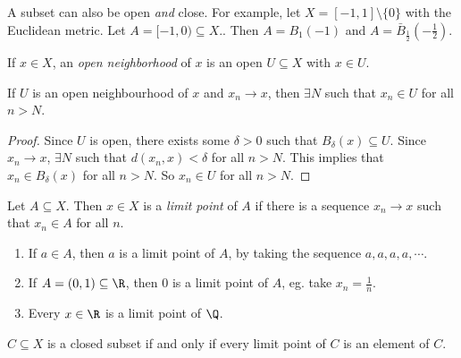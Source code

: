 \documentclass[a4paper]{article}
\begin{document}
A subset can also be open \emph{and} close. For example, let $X = [-1, 1]\setminus \{0\}$ with the Euclidean metric. Let $A = [-1, 0)\subseteq X$.. Then $A = B_1(-1)$ and $A = \bar B_{\frac{1}{2}}(-\frac{1}{2})$.

\begin{defi}
  If $x\in X$, an \emph{open neighborhood} of $x$ is an open $U\subseteq X$ with $x\in U$. 
\end{defi}

\begin{lemma}
  If $U$ is an open neighbourhood of $x$ and $x_n \to x$, then $\exists N$ such that $x_n \in U$ for all $n > N$.
\end{lemma}

\begin{proof}
  Since $U$ is open, there exists some $\delta > 0$ such that $B_\delta(x)\subseteq U$. Since $x_n \to x$, $\exists N$ such that $d(x_n, x) < \delta$ for all $n > N$. This implies that $x_n \in B_\delta(x)$ for all $n > N$. So $x_n \in U$ for all $n > N$.
\end{proof}

\begin{defi}
  Let $A\subseteq X$. Then $x\in X$ is a \emph{limit point} of $A$ if there is a sequence $x_n \to x$ such that $x_n \in A$ for all $n$.
\end{defi}

\begin{eg}\leavevmode
  \begin{enumerate}
    \item If $a\in A$, then $a$ is a limit point of $A$, by taking the sequence $a, a, a, a, \cdots$.
    \item If $A = (0, 1)\subseteq \R$, then $0$ is a limit point of $A$, eg. take $x_n = \frac{1}{n}$.
    \item Every $x\in \R$ is a limit point of $\Q$.
  \end{enumerate}
\end{eg}

\begin{prop}
  $C\subseteq X$ is a closed subset if and only if every limit point of $C$ is an element of $C$.
\end{prop}
\end{document}
